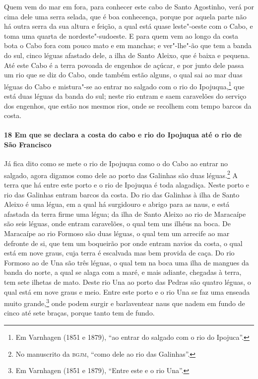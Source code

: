 Quem vem do mar em fora, para conhecer este cabo de Santo Agostinho, verá por cima dele
uma serra selada, que é boa conhecença, porque por aquela parte não há outra serra da sua
altura e feição, a qual está quase leste"-oeste com o Cabo, e toma uma quarta de
nordeste"-sudoeste. E para quem vem ao longo da costa bota o Cabo fora com pouco mato e em
manchas; e ver"-lhe"-ão que tem a banda do sul, cinco léguas afastado dele, a ilha de Santo
Aleixo, que é baixa e pequena. Até este Cabo é a terra povoada de engenhos de açúcar, e
por junto dele passa um rio que se diz do Cabo, onde também estão alguns, o qual sai ao
mar duas léguas do Cabo e mistura"-se ao entrar no salgado com o rio do Ipojuqua,\footnote{
Em Varnhagen (1851 e 1879), ``ao entrar do salgado com o rio do Ipojuca''.} que está duas
léguas da banda do sul; neste rio entram e saem caravelões do serviço dos engenhos, que
estão nos mesmos rios, onde se recolhem com tempo barcos da costa.

\paragraph{18 Em que se declara a costa do cabo e rio do Ipojuqua até o rio de São
Francisco}

Já fica dito como se mete o rio de Ipojuqua como o do Cabo ao entrar no salgado, agora
digamos como dele ao porto das Galinhas são duas léguas.\footnote{ No manuscrito da
\textsc{bgjm}, ``como dele ao rio das Galinhas''.} A terra que há entre este porto e o rio
de Ipojuqua é toda alagadiça. Neste porto e rio das Galinhas entram barcos da costa. Do
rio das Galinhas à ilha de Santo Aleixo é uma légua, em a qual há surgidouro e abrigo para
as naus, e está afastada da terra firme uma légua; da ilha de Santo Aleixo ao rio de
Maracaípe são seis léguas, onde entram caravelões, o qual tem uns ilhéus na boca. De
Maracaípe ao rio Formoso são duas léguas, o qual tem um arrecife ao mar defronte de si,
que tem um boqueirão por onde entram navios da costa, o qual está em nove graus, cuja
terra é escalvada mas bem provida de caça. Do rio Formoso ao de Una são três léguas, o
qual tem na boca uma ilha de mangues da banda do norte, a qual se alaga com a maré, e mais
adiante, chegadas à terra, tem sete ilhetas de mato. Deste rio Una ao porto das Pedras são
quatro léguas, o qual está em nove graus e meio. Entre este porto e o rio Una se faz uma
enseada muito grande,\footnote{ Em Varnhagen (1851 e 1879), ``Entre este e o rio Una''.}
onde podem surgir e barlaventear naus que nadem em fundo de cinco até sete braças, porque
tanto tem de fundo.

